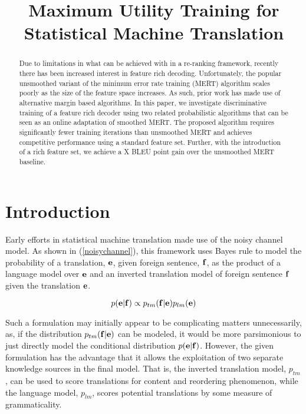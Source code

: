 \documentclass[11pt]{article}
\title{Maximum Utility Training for Statistical Machine Translation}
\author{}
\begin{document}
\maketitle
\begin{abstract}
Due to limitations in what can be achieved with in a re-ranking framework, recently there has been increased interest in feature rich decoding. Unfortunately, the popular unsmoothed variant of the minimum error rate training (MERT) algorithm scales poorly as the size of the feature space increases. As such, prior work has made use of alternative margin based algorithms. In this paper, we investigate discriminative training of a feature rich decoder using two related probabilistic algorithms that can be seen as an online adaptation of smoothed MERT. The proposed algorithm requires significantly fewer training iterations than unsmoothed MERT and achieves competitive performance using a standard feature set. Further, with the introduction of a rich feature set, we achieve a X BLEU point gain over the unsmoothed MERT baseline. 
\end{abstract}

\section{Introduction}

Early efforts in statistical machine translation \cite{brown1993} made use of the noisy channel model. As shown in (\ref{noisychannel}), this framework uses Bayes rule to model the probability of a translation, ${\bf e}$, given foreign sentence, ${\bf f}$, as the product of a language model over ${\bf e}$ and an inverted translation model of foreign sentence ${\bf f}$ given the translation ${\bf e}$. 

\begin{equation}
p({\bf e} | {\bf f}) \propto p_{tm}({\bf f} | {\bf e}) p_{lm}({\bf e})
\label{noisychannel}
\end{equation}

Such a formulation may initially appear to be complicating matters unnecessarily, as, if the distribution $p_{tm}({\bf f}|{\bf e})$ can be modeled, it would be more parsimonious to just directly model the conditional distribution $p({\bf e} | {\bf f})$. However, the given formulation has the advantage that it allows the exploitation of two separate knowledge sources in the final model. That is, the inverted translation model, $p_{tm}$, can be used to score translations for content and reordering phenomenon, while the language model, $p_{lm}$, scores potential translations by some measure of grammaticality. 
\end{document}
